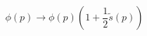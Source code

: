 \begin{equation}
\phi (p) \longrightarrow \phi (p) \left( 1 + \frac{1}{2} \tilde{s} (p)
\right)
\end{equation}

